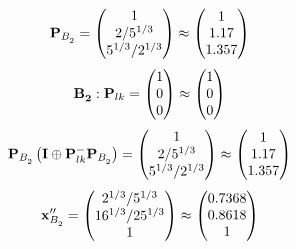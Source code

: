\documentclass[10pt,a4paper]{article}
\begin{document}
	\[
		\bold{P}_{B_2^{}} = 
		\begin{pmatrix}
			{1}{} \\
			{{2}} / {{5^ {1 / 3}}} \\
			{{5^ {1 / 3}}} / {{2^ {1 / 3}}} \\
		\end{pmatrix}
		\approx
		\begin{pmatrix}
			1        \\
			1.17     \\
			1.357    \\
		\end{pmatrix}
	\]
	\[
		\bold{B_2^{}}: \bold{P}_{lk} = 
		\begin{pmatrix}
			{1}{} \\
			{{0}}{} \\
			{{0}}{} \\
		\end{pmatrix}
		\approx
		\begin{pmatrix}
			1        \\
			0        \\
			0        \\
		\end{pmatrix}
	\]
	\[
		\bold{P}_{B_2^{}}\left(\bold{I} \oplus \bold{P}_{lk}^{-}\bold{P}_{B_2^{}}\right) = 
		\begin{pmatrix}
			{1}{} \\
			{{2}} / {{5^ {1 / 3}}} \\
			{{5^ {1 / 3}}} / {{2^ {1 / 3}}} \\
		\end{pmatrix}
		\approx
		\begin{pmatrix}
			1        \\
			1.17     \\
			1.357    \\
		\end{pmatrix}
	\]
	\[
		\bold{x}''_{B_2^{}} = 
		\begin{pmatrix}
			{{2^ {1 / 3}}} / {{5^ {1 / 3}}} \\
			{{16^ {1 / 3}}} / {{25^ {1 / 3}}} \\
			{1}{} \\
		\end{pmatrix}
		\approx
		\begin{pmatrix}
			0.7368   \\
			0.8618   \\
			1        \\
		\end{pmatrix}
	\]

\end{document}
